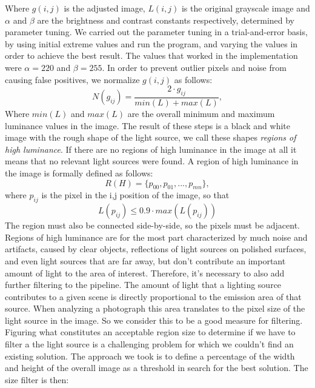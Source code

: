 Where $g(i,j)$ is the adjusted image, $L(i,j)$ is the original grayscale image and $\alpha$ and $\beta$ are the brightness and contrast constants respectively, determined by parameter tuning. We carried out the parameter tuning in a trial-and-error basis, by using initial extreme values and run the program, and varying the values in order to achieve the best result. The values that worked in the implementation were $\alpha = 220$ and $\beta = 255$.
In order to prevent outlier pixels and noise from causing false positives, we normalize $g(i,j)$ as follows:
\begin{equation}
    N(g_{ij}) = \frac{ 2 \cdot g_{ij} }{min(L) + max(L)},
\end{equation}
Where $min(L)$ and $max(L)$ are the overall minimum and maximum luminance values in the image. 
\newline
The result of these steps is a black and white image with the rough shape of the light source, we call these shapes \emph{regions of high luminance}. If there are no regions of high luminance in the image at all it means that no relevant light sources were found. A region of high luminance in the image is formally defined as follows:
\begin{equation}
    R(H) = \{p_{00}, p_{01}, ... , p_{mn}\},
\end{equation}
 where $p_{ij}$ is the pixel in the i,j position of the image, so that 
\[
    L(p_{ij}) \leq 0.9 \cdot max(L(p_{ij})) 
\]
The region must also be connected side-by-side, so the pixels must be adjacent.\newline
Regions of high luminance are for the most part characterized by much noise and artifacts, caused by clear objects, reflections of light sources on polished surfaces, and even light sources that are far away, but don't contribute an important amount of light to the area of interest. Therefore, it's necessary to also add further filtering to the pipeline. \newline
The amount of light that a lighting source contributes to a given scene is directly proportional to the emission area of that source. When analyzing a photograph this area translates to the pixel size of the light source in the image. So we consider this to be a good measure for filtering. Figuring what constitutes an acceptable region size to determine if we have to filter a the light source is a challenging problem for which we couldn't find an existing solution. The approach we took is to define a percentage of the width and height of the overall image as a threshold in search for the best solution. The size filter is then:

